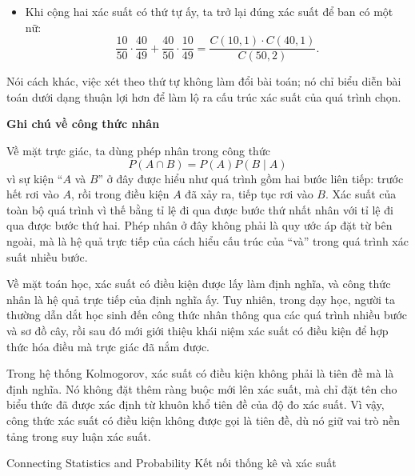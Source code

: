 {\begin{itemize}
      \item Khi cộng hai xác suất có thứ tự ấy, ta trở lại đúng xác suất để ban có một nữ:
      $$
      \frac{10}{50}\cdot\frac{40}{49}+\frac{40}{50}\cdot\frac{10}{49}
      = \frac{C(10,1)\cdot C(40,1)}{C(50,2)}.
      $$
    \end{itemize}

    \noindent
    Nói cách khác, việc xét theo thứ tự không làm đổi bài toán; nó chỉ biểu diễn bài toán dưới dạng thuận lợi hơn để làm lộ ra cấu trúc xác suất của quá trình chọn.

    \noindent
    \textbf{Ghi chú về công thức nhân}\vspace{\baselineskip}

    Về mặt trực giác, ta dùng phép nhân trong công thức
    $$
    P(A\cap B)=P(A)P(B\mid A)
    $$
    vì sự kiện ``$A$ và $B$'' ở đây được hiểu như quá trình gồm hai bước liên tiếp: trước hết rơi vào $A$, rồi trong điều kiện $A$ đã xảy ra, tiếp tục rơi vào $B$. Xác suất của toàn bộ quá trình vì thế bằng tỉ lệ đi qua được bước thứ nhất nhân với tỉ lệ đi qua được bước thứ hai. Phép nhân ở đây không phải là quy ước áp đặt từ bên ngoài, mà là hệ quả trực tiếp của cách hiểu cấu trúc của ``và'' trong quá trình xác suất nhiều bước.

    Về mặt toán học, xác suất có điều kiện được lấy làm định nghĩa, và công thức nhân là hệ quả trực tiếp của định nghĩa ấy. Tuy nhiên, trong dạy học, người ta thường dẫn dắt học sinh đến công thức nhân thông qua các quá trình nhiều bước và sơ đồ cây, rồi sau đó mới giới thiệu khái niệm xác suất có điều kiện để hợp thức hóa điều mà trực giác đã nắm được.

    Trong hệ thống Kolmogorov, xác suất có điều kiện không phải là tiên đề mà là định nghĩa. Nó không đặt thêm ràng buộc mới lên xác suất, mà chỉ đặt tên cho biểu thức đã được xác định từ khuôn khổ tiên đề của độ đo xác suất. Vì vậy, công thức xác suất có điều kiện không được gọi là tiên đề, dù nó giữ vai trò nền tảng trong suy luận xác suất.
  }

\ParallelSection
  {Connecting Statistics and Probability}
  {Kết nối thống kê và xác suất}
  {}

